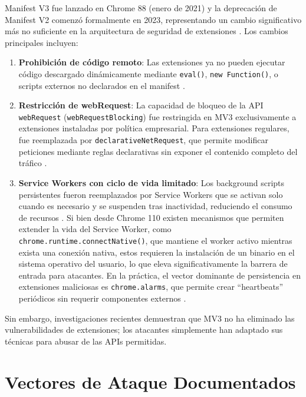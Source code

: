 \documentclass[12pt,oneside]{report}
\begin{document}
Manifest V3 fue lanzado en Chrome 88 (enero de 2021) y la deprecación de Manifest V2 comenzó formalmente en 2023, representando un cambio significativo más no suficiente en la arquitectura de seguridad de extensiones \cite{pantelaios2024manifestv3, manifestv3chrome}. Los cambios principales incluyen:

\begin{enumerate}
    \item \textbf{Prohibición de código remoto}: Las extensiones ya no pueden ejecutar código descargado dinámicamente mediante \texttt{eval()}, \texttt{new Function()}, o scripts externos no declarados en el manifest \cite{manifestv3chrome}.
    \item \textbf{Restricción de webRequest}: La capacidad de bloqueo de la API \texttt{webRequest} (\texttt{webRequestBlocking}) fue restringida en MV3 exclusivamente a extensiones instaladas por política empresarial. Para extensiones regulares, fue reemplazada por \texttt{declarativeNetRequest}, que permite modificar peticiones mediante reglas declarativas sin exponer el contenido completo del tráfico \cite{declarative_net_request}.
    \item \textbf{Service Workers con ciclo de vida limitado}: Los background scripts persistentes fueron reemplazados por Service Workers que se activan solo cuando es necesario y se suspenden tras inactividad, reduciendo el consumo de recursos \cite{service_workers}. Si bien desde Chrome 110 existen mecanismos que permiten extender la vida del Service Worker, como \texttt{chrome.runtime.connectNative()}, que mantiene el worker activo mientras exista una conexión nativa, estos requieren la instalación de un binario en el sistema operativo del usuario, lo que eleva significativamente la barrera de entrada para atacantes. En la práctica, el vector dominante de persistencia en extensiones maliciosas es \texttt{chrome.alarms}, que permite crear ``heartbeats'' periódicos sin requerir componentes externos \cite{seetharam2025genai, socket2025phantom}.
\end{enumerate}

Sin embargo, investigaciones recientes demuestran que MV3 no ha eliminado las vulnerabilidades de extensiones; los atacantes simplemente han adaptado sus técnicas para abusar de las APIs permitidas.

\section{Vectores de Ataque Documentados}
\end{document}
